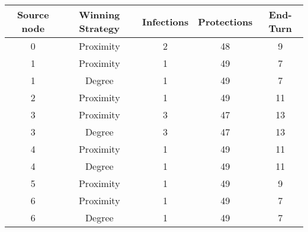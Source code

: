 \documentclass[results.tex]{subfiles}
\begin{document}
    \begin{center}
        \begin{tabular}{| c || c | c | c | c |}
            \hline
            {\bfseries Source node} & {\bfseries Winning Strategy} & {\bfseries Infections} & {\bfseries Protections}
            & {\bfseries End-Turn}
            \\  %
            \hline\hline
            0                       & Proximity                    & 2                      & 48                      & 9                    \\
            \hline
            1                       & Proximity                    & 1                      & 49                      & 7                    \\
            \hline
            1                       & Degree                       & 1                      & 49                      & 7                    \\
            \hline
            2                       & Proximity                    & 1                      & 49                      & 11                   \\
            \hline
            3                       & Proximity                    & 3                      & 47                      & 13                   \\
            \hline
            3                       & Degree                       & 3                      & 47                      & 13                   \\
            \hline
            4                       & Proximity                    & 1                      & 49                      & 11                   \\
            \hline
            4                       & Degree                       & 1                      & 49                      & 11                   \\
            \hline
            5                       & Proximity                    & 1                      & 49                      & 9                    \\
            \hline
            6                       & Proximity                    & 1                      & 49                      & 7                    \\
            \hline
            6                       & Degree                       & 1                      & 49                      & 7                    \\

\end{tabular}
\end{center}
\end{document}
